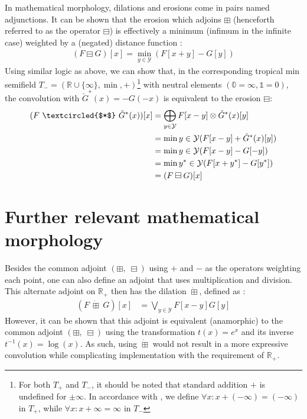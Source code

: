 \documentclass[a4paper, 12pt]{report}
\begin{document}
In mathematical morphology, dilations and erosions come in pairs named adjunctions. It can be shown that the erosion which adjoins $\boxplus$ (henceforth referred to as the operator $\boxminus$) is effectively a minimum (infimum in the infinite case) weighted by a (negated) distance function \cite{heijmans1996morphological}: 
\begin{align}
	(F \boxminus G)[x]=\min_{y\in \mathcal{Y}}(F[x+y] - G[y])
\end{align}
\noindent
Using similar logic as above, we can show that, in the corresponding tropical min semifield $T_-=(\mathbb{R}\cup\{\infty\},\min,+)$\footnote{For both $T_+$ and $T_-$, it should be noted that standard addition $+$ is undefined for $\pm\infty$. In accordance with \cite{maragos}, we define $\forall x: x+(-\infty)=(-\infty)$ in $T_+$, while $\forall x: x+\infty=\infty$ in $T_-$} \cite{maragos} with neutral elements $(\mathbb{0}=\infty, \mathbb{1}=0)$, the convolution with $\check{G}^*(x)=-G(-x)$ is equivalent to the erosion $\boxminus$:
\begin{align}
	(F ~\textcircled{$*$}~ \check{G}^*(x))[x]
	&= \bigoplus_{y\in \mathcal{Y}}F[x-y] \otimes \check{G}^*(x)[y] \\
	&= \min{y\in \mathcal{Y}}(F[x-y] + \check{G}^*(x)[y]) \\
	&= \min{y\in \mathcal{Y}}(F[x-y] - G[-y]) \\
	&= \min{y^*\in \mathcal{Y}}(F[x+y^*] - G[y^*]) \\
	&= (F \boxminus G)[x]
\end{align}

\section{Further relevant mathematical morphology}
Besides the common adjoint $(\boxplus,\; \boxminus)$ using $+$ and $-$ as the operators weighting each point, one can also define an adjoint that uses multiplication and division. This alternate adjoint on $\mathbb{R}_+$ then has the dilation $\dot \boxplus$, defined as \cite{heijmans1996morphological}:
\begin{align}
	(F~ \dot\boxplus~ G)[x] &= \bigvee_{y\in \mathcal{Y}}F[x-y]G[y]
\end{align}
However, it can be shown that this adjoint is equivalent (anamorphic) to the common adjoint $(\boxplus,\; \boxminus)$ using the transformation $t(x)=e^x$ and its inverse $t^{-1}(x)=\log(x)$. As such, using $\dot \boxplus$ would not result in a more expressive convolution while complicating implementation with the requirement of $\mathbb{R}_+$.
\end{document}
